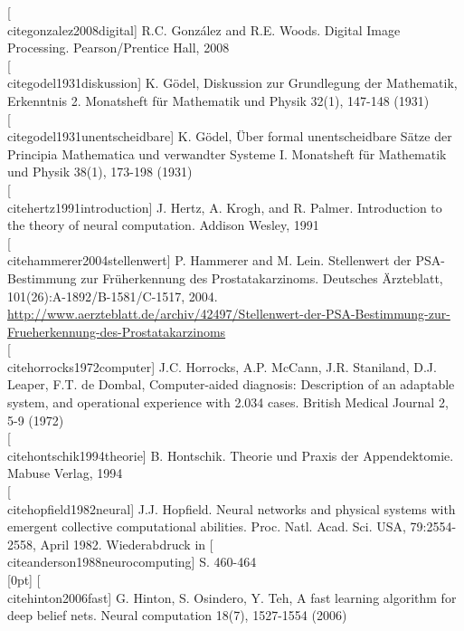 \documentclass[10pt]{book}
\begin{document}
[\\cite{gonzalez2008digital}] R.C. González and R.E. Woods. Digital Image Processing. Pearson/Prentice Hall, 2008\\[0pt]
[\\cite{godel1931diskussion}] K. Gödel, Diskussion zur Grundlegung der Mathematik, Erkenntnis 2. Monatsheft für Mathematik und Physik 32(1), 147-148 (1931)\\[0pt]
[\\cite{godel1931unentscheidbare}] K. Gödel, Über formal unentscheidbare Sätze der Principia Mathematica und verwandter Systeme I. Monatsheft für Mathematik und Physik 38(1), 173-198 (1931)\\[0pt]
[\\cite{hertz1991introduction}] J. Hertz, A. Krogh, and R. Palmer. Introduction to the theory of neural computation. Addison Wesley, 1991\\[0pt]
[\\cite{hammerer2004stellenwert}] P. Hammerer and M. Lein. Stellenwert der PSA-Bestimmung zur Früherkennung des Prostatakarzinoms. Deutsches Ärzteblatt, 101(26):A-1892/B-1581/C-1517, 2004. \href{http://www.aerzteblatt.de/archiv/42497/Stellenwert-der-PSA-Bestimmung-zur-Frueherkennung-des-Prostatakarzinoms}{http://www.aerzteblatt.de/archiv/42497/Stellenwert-der-PSA-Bestimmung-zur-Frueherkennung-des-Prostatakarzinoms}\\[0pt]
[\\cite{horrocks1972computer}] J.C. Horrocks, A.P. McCann, J.R. Staniland, D.J. Leaper, F.T. de Dombal, Computer-aided diagnosis: Description of an adaptable system, and operational experience with 2.034 cases. British Medical Journal 2, 5-9 (1972)\\[0pt]
[\\cite{hontschik1994theorie}] B. Hontschik. Theorie und Praxis der Appendektomie. Mabuse Verlag, 1994\\[0pt]
[\\cite{hopfield1982neural}] J.J. Hopfield. Neural networks and physical systems with emergent collective computational abilities. Proc. Natl. Acad. Sci. USA, 79:2554-2558, April 1982. Wiederabdruck in [\\cite{anderson1988neurocomputing}] S. 460-464\\
[0pt]
[\\cite{hinton2006fast}] G. Hinton, S. Osindero, Y. Teh, A fast learning algorithm for deep belief nets. Neural computation 18(7), 1527-1554 (2006)\\[0pt]
\end{document}
